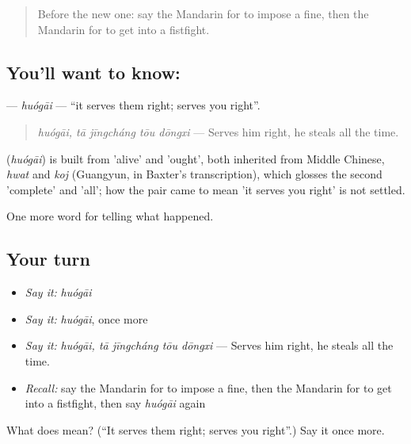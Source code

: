 \begin{quote}
Before the new one: say the Mandarin for to impose a fine, then the Mandarin for to get into a fistfight.
\end{quote}

\subsection*{You'll want to know: }
\textbf{} — \emph{huógāi} — \textquotedblleft{}it serves them right; serves you right\textquotedblright{}.

\begin{quote}
\textbf{} \emph{huógāi, tā jīngcháng tōu dōngxi} — Serves him right, he steals all the time.
\end{quote}

\begin{cousinweb}
\textbf{} (\emph{huógāi}) is built from  'alive' and  'ought', both inherited from Middle Chinese, \emph{hwat} and \emph{koj} (Guangyun, in Baxter's transcription), which glosses the second 'complete' and 'all'; how the pair came to mean 'it serves you right' is not settled.
\end{cousinweb}

\begin{grammarlens}[title={What you've built}]
One more word for telling what happened.
\end{grammarlens}

\subsection*{Your turn}
\begin{itemize}
\raggedright
  \item \emph{Say it:} \emph{huógāi}
  \item \emph{Say it:} \emph{huógāi}, once more
  \item \emph{Say it:} \emph{huógāi, tā jīngcháng tōu dōngxi} — Serves him right, he steals all the time.
  \item \emph{Recall:} say the Mandarin for to impose a fine, then the Mandarin for to get into a fistfight, then say \emph{huógāi} again
\end{itemize}

\begin{tcolorbox}[breakable,colback=teal!4,colframe=teal!35!black,title={Before you move on}]
What does  mean? (\textquotedblleft{}It serves them right; serves you right\textquotedblright{}.) Say it once more.
\end{tcolorbox}
